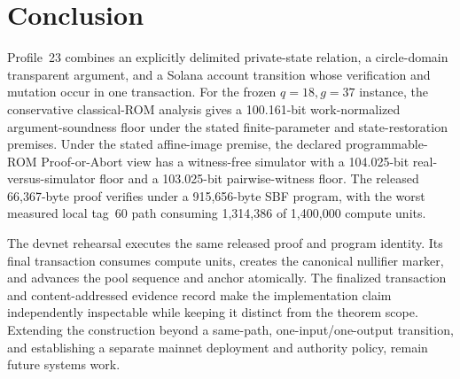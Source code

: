 \section{Conclusion}
\label{sec:conclusion}

Profile~23 combines an explicitly delimited private-state relation, a
circle-domain transparent argument, and a Solana account transition whose
verification and mutation occur in one transaction.  For the frozen
\(q=18,g=37\)
instance, the conservative classical-ROM analysis gives a 100.161-bit
work-normalized argument-soundness floor under the stated finite-parameter
and state-restoration premises.  Under the stated affine-image premise, the
declared programmable-ROM Proof-or-Abort view has a witness-free simulator with a 104.025-bit
real-versus-simulator floor and a 103.025-bit pairwise-witness floor.  The
released 66,367-byte proof verifies under a 915,656-byte SBF program, with the
worst measured local tag~60 path consuming 1,314,386 of 1,400,000 compute
units.

The devnet rehearsal executes the same released proof and program identity.
Its final transaction consumes \ProfileDevnetComputeUnits{} compute units,
creates the canonical
nullifier marker, and advances the pool sequence and anchor atomically.  The
finalized transaction and content-addressed evidence record make the implementation
claim independently inspectable while keeping it distinct from the theorem
scope.  Extending the construction beyond a same-path, one-input/one-output
transition, and establishing a separate mainnet deployment and authority
policy, remain future systems work.
